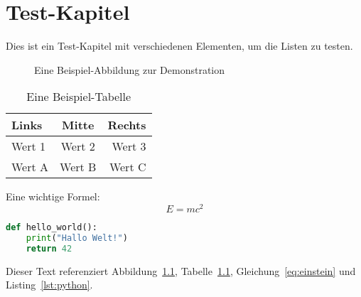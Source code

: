 
\chapter{Test-Kapitel}
\label{chap:test}

Dies ist ein Test-Kapitel mit verschiedenen Elementen, um die Listen zu testen.

\begin{figure}[h]
	\centering
	\caption{Eine Beispiel-Abbildung zur Demonstration}
	\label{fig:beispiel}
\end{figure}

\begin{table}[h]
	\centering
	\caption{Eine Beispiel-Tabelle}
	\label{tab:beispiel}
	\begin{tabular}{|l|c|r|}
		\hline
		\textbf{Links} & \textbf{Mitte} & \textbf{Rechts} \\
		\hline
		Wert 1         & Wert 2         & Wert 3          \\
		Wert A         & Wert B         & Wert C          \\
		\hline
	\end{tabular}
\end{table}

Eine wichtige Formel:
\begin{equation}
	E = mc^2
	\label{eq:einstein}
\end{equation}

\begin{lstlisting}[caption={Beispiel Python-Code},label={lst:python},language=Python]
def hello_world():
    print("Hallo Welt!")
    return 42
\end{lstlisting}

Dieser Text referenziert Abbildung~\ref{fig:beispiel}, Tabelle~\ref{tab:beispiel},
Gleichung~\ref{eq:einstein} und Listing~\ref{lst:python}.
